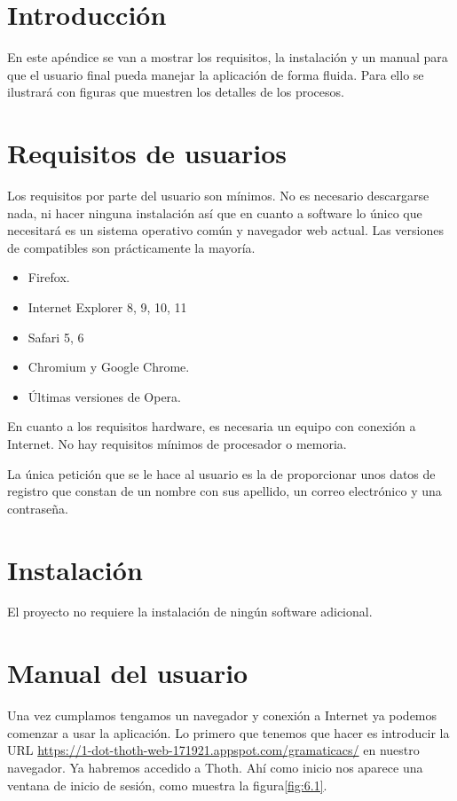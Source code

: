 
\section{Introducción}

En este apéndice se van a mostrar los requisitos, la instalación y un manual para que el usuario final pueda manejar la aplicación de forma fluida. Para ello se ilustrará con figuras que muestren los detalles de los procesos.

\section{Requisitos de usuarios}

Los requisitos por parte del usuario son mínimos. No es necesario descargarse nada, ni hacer ninguna instalación así que en cuanto a software lo único que necesitará es un sistema operativo común y navegador web actual. Las versiones de compatibles son prácticamente la mayoría.

\begin{itemize}
    \item Firefox.
    \item Internet Explorer 8, 9, 10, 11
    \item Safari 5, 6
    \item Chromium y Google Chrome.
    \item Últimas versiones de Opera.
\end{itemize}

En cuanto a los requisitos hardware, es necesaria un equipo con conexión a Internet. No hay requisitos mínimos de procesador o memoria. 

La única petición que se le hace al usuario es la de proporcionar unos datos de registro que constan de un nombre con sus apellido, un correo electrónico y una contraseña.  

\section{Instalación}

El proyecto no requiere la instalación de ningún software adicional.

\section{Manual del usuario}

Una vez cumplamos tengamos un navegador y conexión a Internet ya podemos comenzar a usar la aplicación. Lo primero que tenemos que hacer es introducir la URL \url{https://1-dot-thoth-web-171921.appspot.com/gramaticacs/} en nuestro navegador. Ya habremos accedido a Thoth. Ahí como inicio nos aparece una ventana de inicio de sesión, como muestra la figura\ref{fig:6.1}.


